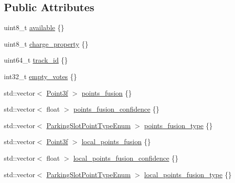 \subsection*{Public Attributes}
\begin{DoxyCompactItemize}
\item 
uint8\+\_\+t \hyperlink{structmaf__perception__interface_1_1FusionParkingSlotData_ac5c0bca45579b29302dd04e98823b1a7}{available} \{\}
\item 
uint8\+\_\+t \hyperlink{structmaf__perception__interface_1_1FusionParkingSlotData_af51ca2b2d233cab5cd3855c6a2354e32}{charge\+\_\+property} \{\}
\item 
uint64\+\_\+t \hyperlink{structmaf__perception__interface_1_1FusionParkingSlotData_a5d35bf373e3f325d92d733e9db78e24d}{track\+\_\+id} \{\}
\item 
int32\+\_\+t \hyperlink{structmaf__perception__interface_1_1FusionParkingSlotData_af8ebee23eaf3e276108f6067f16973f9}{empty\+\_\+votes} \{\}
\item 
std\+::vector$<$ \hyperlink{structmaf__perception__interface_1_1Point3f}{Point3f} $>$ \hyperlink{structmaf__perception__interface_1_1FusionParkingSlotData_abc0bbb7e0e09849286b6df5b6b4db416}{points\+\_\+fusion} \{\}
\item 
std\+::vector$<$ float $>$ \hyperlink{structmaf__perception__interface_1_1FusionParkingSlotData_ae9d398cf21af53a031a79d2035da62c3}{points\+\_\+fusion\+\_\+confidence} \{\}
\item 
std\+::vector$<$ \hyperlink{structmaf__perception__interface_1_1ParkingSlotPointTypeEnum}{Parking\+Slot\+Point\+Type\+Enum} $>$ \hyperlink{structmaf__perception__interface_1_1FusionParkingSlotData_a909f13b08904402f819797248f61c37e}{points\+\_\+fusion\+\_\+type} \{\}
\item 
std\+::vector$<$ \hyperlink{structmaf__perception__interface_1_1Point3f}{Point3f} $>$ \hyperlink{structmaf__perception__interface_1_1FusionParkingSlotData_afac03ae922b79d41b65d0f4774343095}{local\+\_\+points\+\_\+fusion} \{\}
\item 
std\+::vector$<$ float $>$ \hyperlink{structmaf__perception__interface_1_1FusionParkingSlotData_a20a320fd2591b74b86edbeaa9579f4fb}{local\+\_\+points\+\_\+fusion\+\_\+confidence} \{\}
\item 
std\+::vector$<$ \hyperlink{structmaf__perception__interface_1_1ParkingSlotPointTypeEnum}{Parking\+Slot\+Point\+Type\+Enum} $>$ \hyperlink{structmaf__perception__interface_1_1FusionParkingSlotData_aa110061efef92b824cfd3f3295aeed83}{local\+\_\+points\+\_\+fusion\+\_\+type} \{\}

\end{DoxyCompactItemize}
